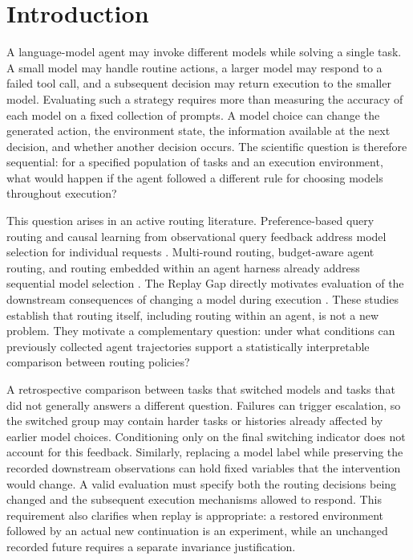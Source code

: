 \section{Introduction}
\label{sec:introduction}

A language-model agent may invoke different models while solving a single task. A small model may handle routine actions, a larger model may respond to a failed tool call, and a subsequent decision may return execution to the smaller model. Evaluating such a strategy requires more than measuring the accuracy of each model on a fixed collection of prompts. A model choice can change the generated action, the environment state, the information available at the next decision, and whether another decision occurs. The scientific question is therefore sequential: for a specified population of tasks and an execution environment, what would happen if the agent followed a different rule for choosing models throughout execution?

This question arises in an active routing literature. Preference-based query routing and causal learning from observational query feedback address model selection for individual requests \citep{ong2025routellm,tsiourvas2025causal}. Multi-round routing, budget-aware agent routing, and routing embedded within an agent harness already address sequential model selection \citep{zhang2025routerr1,zhang2026baar,liu2026harness}. The Replay Gap directly motivates evaluation of the downstream consequences of changing a model during execution \citep{gonuguntla2026replay}. These studies establish that routing itself, including routing within an agent, is not a new problem. They motivate a complementary question: under what conditions can previously collected agent trajectories support a statistically interpretable comparison between routing policies?

A retrospective comparison between tasks that switched models and tasks that did not generally answers a different question. Failures can trigger escalation, so the switched group may contain harder tasks or histories already affected by earlier model choices. Conditioning only on the final switching indicator does not account for this feedback. Similarly, replacing a model label while preserving the recorded downstream observations can hold fixed variables that the intervention would change. A valid evaluation must specify both the routing decisions being changed and the subsequent execution mechanisms allowed to respond. This requirement also clarifies when replay is appropriate: a restored environment followed by an actual new continuation is an experiment, while an unchanged recorded future requires a separate invariance justification.

